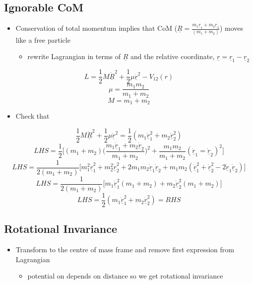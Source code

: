\documentclass[a4paper,11pt,normalem]{article}
\begin{document}
\subsection{Ignorable CoM}\label{ignorable-com}

\begin{itemize}
\item
  Conservation of total momentum implies that CoM
  (\(\underline{R} = \frac{m_1 \underline{r}_1 + m_2 \underline{r}_2}{(m_1 + m_2)}\))
  moves like a free particle
  \begin{itemize}
  \item
    rewrite Lagrangian in terms of \(\underline{R}\) and the relative
    coordinate, \(\underline{r} = \underline{r}_1 - \underline{r}_2\)
  \end{itemize}
\end{itemize}

\[
    L = \frac{1}{2}M\dot{\underline{R}}^2 + \frac{1}{2}\mu \underline{\dot{r}}^2 - V_{12}(r) \]
\[
    \mu = \frac{m_1 m_2}{m_1 + m_2} \] \[
    M = m_1 + m_2
\]

\begin{itemize}
\item
  Check that
\end{itemize}

\[
    \frac{1}{2}M\dot{\underline{R}}^2 + \frac{1}{2}\mu \underline{\dot{r}}^2 = \frac{1}{2}(m_1 \dot{\underline{r}}_{1}^2 + m_2 \dot{\underline{r}}_{2}^2) \]
\[
    LHS = \frac{1}{2} \Bigg[(m_1 + m_2)\Big(\frac{m_1 \underline{\dot{r}}_1 + m_2 \underline{\dot{r}}_2}{m_1 + m_2}\Big)^2 + \frac{m_1 m_2}{m_1 + m_2}(\underline{\dot{r}}_1 = \underline{\dot{r}}_2)^2 \Bigg] \]
\[
    LHS = \frac{1}{2(m_1 + m_2)} \Bigg[m_{1}^2 \underline{\dot{r}}_{1}^2 + m_{2}^2 \underline{\dot{r}}_{2}^2 + 2m_1 m_2 \underline{\dot{r}}_1 \underline{\dot{r}}_2 + m_1 m_2 (\underline{\dot{r}}_{1}^2 + \underline{\dot{r}}_{2}^2 - 2\underline{\dot{r}}_1 \underline{\dot{r}}_2) \Bigg] \]
\[
    LHS = \frac{1}{2(m_1 + m_2)} \Bigg[m_1 \underline{\dot{r}}_{1}^2 (m_1 + m_2) + m_2 \underline{\dot{r}}_{2}^2 (m_1 + m_2) \Bigg] \]
\[
    LHS = \frac{1}{2}(m_1 \dot{\underline{r}}_{1}^2 + m_2 \dot{\underline{r}}_{2}^2) = RHS
\]

\subsection{Rotational Invariance}\label{rotational-invariance}

\begin{itemize}
\item
  Transform to the centre of mass frame and remove first expression from
  Lagrangian
  \begin{itemize}
  \item
    potential on depends on distance so we get rotational invariance
  \end{itemize}
\end{itemize}
\end{document}
